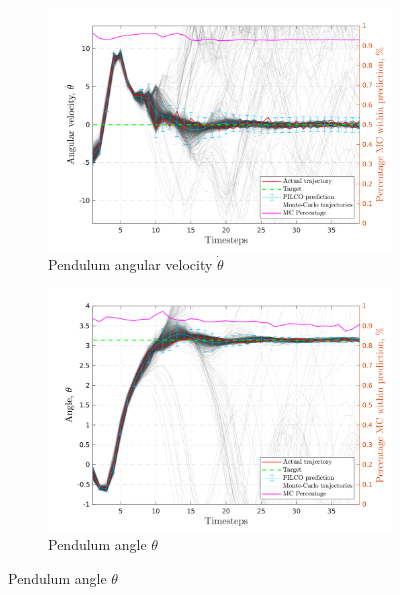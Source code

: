 \begin{figure}[htp!]
  \vspace{4ex}  %
  \begin{subfigure}[b]{0.48\linewidth}
    \centering
    \includegraphics[height=0.22\textheight,width=1\textwidth]{Chapter3/Figures/cp_MC_rollout_Ep_15_Dim_3.png} 
    \caption{Pendulum angular velocity $\dot \theta$} 
    \label{Fig:Re-cp-pen-velocity} 
  \end{subfigure} 
  \hspace{\fill}
  \begin{subfigure}[b]{0.48\linewidth}
    \centering
    \includegraphics[height=0.22\textheight,width=1\textwidth]{Chapter3/Figures/cp_MC_rollout_Ep_15_Dim_4.png} 
    \caption{Pendulum angle $\theta$} 
    \label{Fig:Re-cp-pen-angle} 
  \end{subfigure} 


\end{figure}
